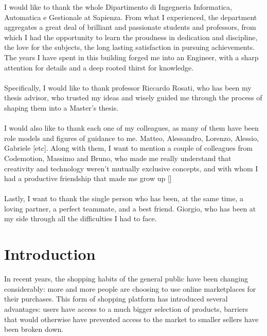 \documentclass[LaM,binding=0.6cm]{sapthesis}
\begin{document}
\begin{acknowledgments}
I would like to thank the whole Dipartimento di Ingegneria Informatica, Automatica e Gestionale at Sapienza. 
From what I experienced, the department aggregates a great deal of brilliant and passionate students and professors, from which I had the opportunity to learn the proudness in dedication and discipline, the love for the subjects, the long lasting satisfaction in pursuing achievements.
The years I have spent in this building forged me into an Engineer, with a sharp attention for details and a deep rooted thirst for knowledge.
\\
\\
Specifically, I would like to thank professor Riccardo Rosati, who has been my thesis advisor, who trusted my ideas and wisely guided me through the process of shaping them into a Master's thesis.
\\
\\
I would also like to thank each one of my colleagues, as many of them have been role models and figures of guidance to me. Matteo, Alessandro, Lorenzo, Alessio, Gabriele [etc]. Along with them, I want to mention a couple of colleagues from Codemotion, Massimo and Bruno, who made me really understand that creativity and technology weren't mutually exclusive concepts, and with whom I had a productive friendship that made me grow up []
\\ 
\\
Lastly, I want to thank the single person who has been, at the same time, a loving partner, a perfect teammate, and a best friend. 
Giorgio, who has been at my side through all the difficulties I had to face. 
\\

\end{acknowledgments}

\tableofcontents

\mainmatter

\chapter{Introduction}
 In recent years, the shopping habits of the general public have been changing considerably: more and more people are choosing to use online marketplaces for their purchases. This form of shopping platform has introduced several advantages: users have access to a much bigger selection of products, barriers that would otherwise have prevented access to the market to smaller sellers have been broken down.
\end{document}
